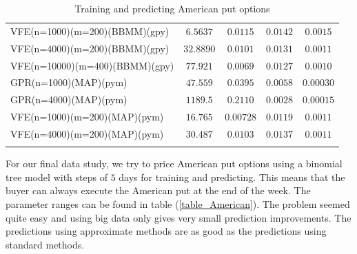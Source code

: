 \documentclass[12pt,a4paper,oneside]{book}
\begin{document}
\begin{table}
\begin{tabular}[t]{lcccc}
VFE(n=1000)(m=200)(BBMM)(gpy)   & $6.5637$ & $0.0115$   & $0.0142$ & $0.0015$ \\\addlinespace
VFE(n=4000)(m=200)(BBMM)(gpy)   & $32.8890$ & $0.0101$   & $0.0131$ & $0.0011$ \\\addlinespace
VFE(n=10000)(m=400)(BBMM)(gpy)   & $77.921$ & $0.0069$   & $0.0127$ & $0.0010$ \\\addlinespace
GPR(n=1000)(MAP)(pym)   & $47.559$  &  $0.0395$  & $0.0058$  & $0.00030$ \\\addlinespace
GPR(n=4000)(MAP)(pym)   & $1189.5$ & $0.2110$   & $0.0028$ & $0.00015$  \\\addlinespace
VFE(n=1000)(m=200)(MAP)(pym)   & $16.765$ & $0.00728$   & $0.0119$ & $ 0.0011$ \\\addlinespace
VFE(n=4000)(m=200)(MAP)(pym)   & $30.487$ & $0.0103$   & $0.0137$ & $0.0011$  \\\addlinespace
\\\bottomrule
\end{tabular}
\caption{Training and predicting American put options}\label{Result_American}
\end{table}



\iffalse

For our final data study, we try to price American put options using a binomial tree model with steps of $5$ days for training and predicting. This means that the buyer can always execute the American put at the end of the week. The parameter ranges can be found in table (\ref{table_American}). The problem seemed quite easy and using big data only gives very small prediction improvements. The predictions using approximate methods are as good as the predictions using standard methods.
\end{document}
